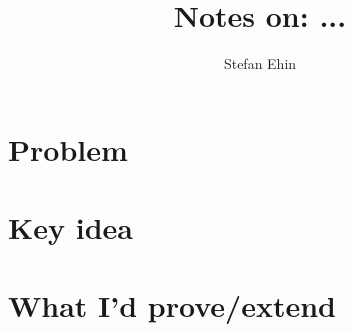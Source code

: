 \documentclass{article}
\author{Stefan Ehin}
\title{Notes on: ...}
\begin{document}
\maketitle

\section*{Problem}

\section*{Key idea}

\section*{What I'd prove/extend}
	
\end{document}
